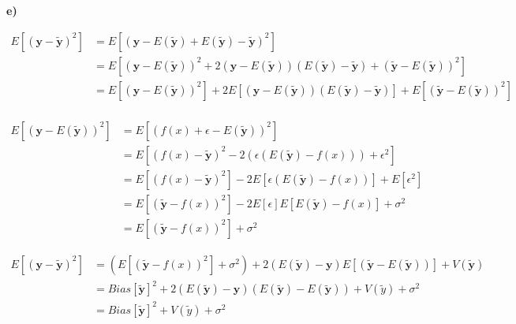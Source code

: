 \documentclass[11pt,a4paper,oldfontcommands]{memoir}
\begin{document}
\textbf{e)}

\begin{align*}
    E\left[(\boldsymbol{y} - \boldsymbol{\tilde y})^2\right] &= E\left[(\boldsymbol{y} - E(\boldsymbol{\tilde y}) + E(\boldsymbol{\tilde y}) - \boldsymbol{\tilde y})^2\right]\\
    &= E\left[(\boldsymbol{y} - E(\boldsymbol{\tilde y}))^2 + 2(\boldsymbol{y} - E(\boldsymbol{\tilde y}))(E(\boldsymbol{\tilde y}) - \boldsymbol{\tilde y}) + (\boldsymbol{\tilde y} - E(\boldsymbol{\tilde y}))^2\right]\\
    &= E\left[(\boldsymbol{y} - E(\boldsymbol{\tilde y}))^2\right] + 2E\left[(\boldsymbol{y} - E(\boldsymbol{\tilde y}))(E(\boldsymbol{\tilde y}) - \boldsymbol{\tilde y})\right] + E\left[(\boldsymbol{\tilde y} - E(\boldsymbol{\tilde y}))^2\right]\\
\end{align*}

\begin{align*}
    E\left[(\boldsymbol{y} - E(\boldsymbol{\tilde y}))^2\right] &= E\left[(f(x) + \epsilon - E(\boldsymbol{\tilde y}))^2\right]\\
    &= E\left[(f(x)-\boldsymbol{\tilde y})^2 - 2(\epsilon(E(\boldsymbol{\tilde y}) - f(x))) + \epsilon^2\right]\\
    &= E\left[(f(x)-\boldsymbol{\tilde y})^2\right] - 2E\left[\epsilon(E(\boldsymbol{\tilde y}) - f(x))\right] + E[\epsilon^2]\\
    &= E\left[(\boldsymbol{\tilde y}-f(x))^2\right] - 2E[\epsilon]E\left[E(\boldsymbol{\tilde y}) - f(x)\right]+ \sigma^2\\
    &= E\left[(\boldsymbol{\tilde y}-f(x))^2\right] + \sigma^2
\end{align*}

\begin{align*}
    E\left[(\boldsymbol{y} - \boldsymbol{\tilde y})^2\right] &= (E\left[(\boldsymbol{\tilde y}-f(x))^2\right] + \sigma^2) + 2(E(\boldsymbol{\tilde y}) - \boldsymbol{y})E\left[(\boldsymbol{\tilde y} - E(\boldsymbol{\tilde y}))\right]+V(\boldsymbol{\tilde y})\\
    &= Bias[\boldsymbol{\tilde y}]^2 + 2(E(\boldsymbol{\tilde y}) - \boldsymbol{y})(E(\boldsymbol{\tilde y}) - E(\boldsymbol{\tilde y})) + V(\tilde y) + \sigma^2\\
    &= Bias[\boldsymbol{\tilde y}]^2 + V(\tilde y) + \sigma^2
\end{align*}
\end{document}
